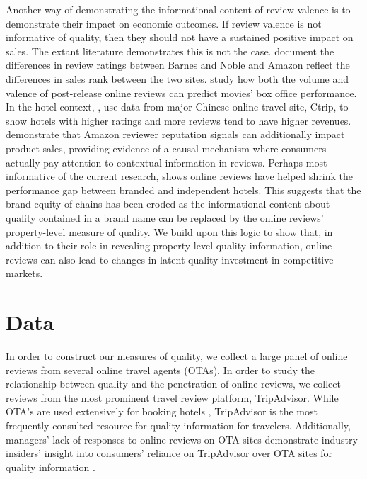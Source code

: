 \documentclass[mksc,blindrev]{informs3} %
\begin{document}
Another way of demonstrating the informational content of review valence is to demonstrate their impact on economic outcomes. If review valence is not informative of quality, then they should not have a sustained positive impact on sales. The extant literature demonstrates this is not the case. \citet{chevalier2006effect} document the differences in review ratings between Barnes and Noble and Amazon reflect the differences in sales rank between the two sites. \citet{dellarocas2007exploring} study how both the volume and valence of post-release online reviews can predict movies' box office performance. In the hotel context, \citet{ye2009impact}, use data from major Chinese online travel site, Ctrip, to show hotels with higher ratings and more reviews tend to have higher revenues. \citet{hu2008online} demonstrate that Amazon reviewer reputation signals can additionally impact product sales, providing evidence of a causal mechanism where consumers actually pay attention to contextual information in reviews. Perhaps most informative of the current research, \citet{hollenbeck2018} shows online reviews have helped shrink the performance gap between branded and independent hotels. This suggests that the brand equity of chains has been eroded as the informational content about quality contained in a brand name can be replaced by the online reviews' property-level measure of quality. We build upon this logic to show that, in addition to their role in revealing property-level quality information, online reviews can also lead to changes in latent quality investment in competitive markets.

\section{Data}\label{sec:data}

In order to construct our measures of quality, we collect a large panel of online reviews from several online travel agents (OTAs). In order to study the relationship between quality and the penetration of online reviews, we collect reviews from the most prominent travel review platform, TripAdvisor. While OTA's are used extensively for booking hotels \citep{LVsurvey2016}, TripAdvisor is the most frequently consulted resource for quality information for travelers. Additionally, managers' lack of responses to online reviews on OTA sites demonstrate industry insiders' insight into consumers' reliance on TripAdvisor over OTA sites for quality information \citep{proserpio2017online}.
\end{document}
